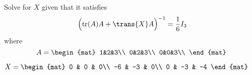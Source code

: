 
\begin{Exercise}[
name={},
title={}, 
difficulty=0,
origin={\cite{YL}}]
Solve for $X$ given that it satisfies
\[
\Big(\text{tr}(A)A+\trans{X}A\Big)^{-1}=\frac{1}{6}I_3
\]
where
\[
A=
\begin{mat}
1&2&3\\
0&2&3\\
0&0&3\\
\end{mat}\;
\]

\end{Exercise}

\begin{Answer}
$
X=
\begin{mat}
0 & 0 & 0\\
-6 & -3 & 0\\
0 & -3 & -4
\end{mat}
$
\end{Answer}
